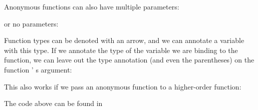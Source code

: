 \documentclass{article}
\begin{document}
\begin{mdP}[class={indent},data-line={107}]%
{}Anonymous functions can also have multiple parameters:%
\end{mdP}%
\begin{mdPre}[class={para-block,pre-indented},data-line={109}]%
%
\end{mdPre}%
\begin{mdP}[data-line={111}]%
{}or no parameters:%
\end{mdP}%
\begin{mdPre}[class={para-block,pre-indented},data-line={113}]%
%
\end{mdPre}%
\begin{mdP}[data-line={115}]%
{}Function types can be denoted with an arrow, and we can annotate
a variable with this type.  If we annotate the type of the variable
we are binding to the function, we can leave out the type annotation
(and even the parentheses) on the function%
{}{'}%
{}s argument:%
\end{mdP}%
\begin{mdPre}[class={para-block,pre-indented},data-line={120}]%
%
\end{mdPre}%
\begin{mdP}[data-line={122}]%
{}This also works if we pass an anonymous function to a higher-order
function:%
\end{mdP}%
\begin{mdPre}[class={para-block,pre-indented},data-line={125}]%
%
\end{mdPre}%
\begin{mdP}[data-line={128}]%
{}The code above can be found in %
{}%
{}%
\end{mdP}%
\end{document}
